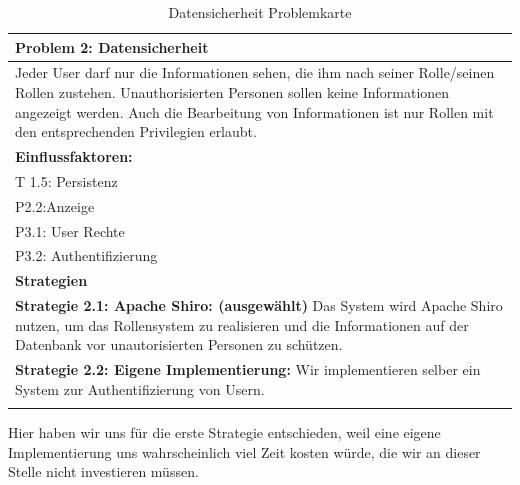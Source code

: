 \documentclass[enabledeprecatedfontcommands,fontsize=12pt,paper=a4,twoside]{scrartcl}
\begin{document}
\begin{table}[H]
    \centering
    \begin{tabular}{|p{15cm}|}
    \hline
          \textbf{Problem 2:} Datensicherheit \\ \hline
          Jeder User darf nur die Informationen sehen, die ihm nach seiner Rolle/seinen Rollen zustehen. Unauthorisierten Personen sollen keine Informationen angezeigt werden. Auch die Bearbeitung von Informationen ist nur Rollen mit den entsprechenden Privilegien erlaubt. \\ \hline
          \textbf{Einflussfaktoren: } \\
          T 1.5: Persistenz \\
	P2.2:Anzeige \\
	P3.1: User Rechte \\
	P3.2: Authentifizierung \\
         \hline
          \textbf{Strategien} \\ \hline
            {}          
           \label{strategie:2.1}     
          \textbf{Strategie 2.1: Apache Shiro: (ausgewählt)} Das System wird Apache Shiro nutzen, um das Rollensystem zu realisieren und die Informationen auf der Datenbank vor unautorisierten Personen zu schützen. \\ 
            {}          
           \label{strategie:2.2}     
           \textbf{Strategie 2.2: Eigene Implementierung:} Wir implementieren selber ein System zur Authentifizierung von Usern. \\
          \\ \hline
    \end{tabular}
    \caption{Datensicherheit Problemkarte}
    \label{tab:ProblemKarte2}
\end{table}
Hier haben wir uns für die erste Strategie entschieden, weil eine eigene Implementierung uns wahrscheinlich viel Zeit kosten würde, die wir an dieser Stelle nicht investieren müssen. \\
\end{document}
